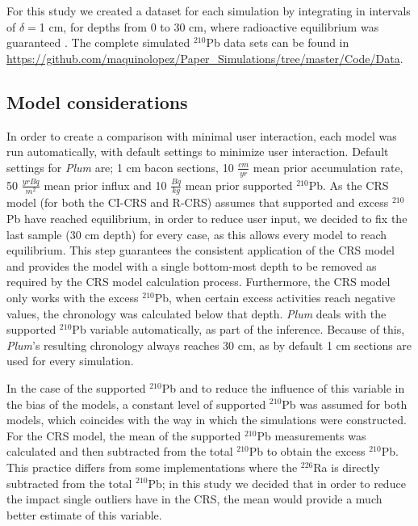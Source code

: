 \documentclass [10pt] {article}
\begin{document}
For this study we created a dataset for each simulation by integrating in intervals of $\delta =$1 cm, for depths from  0 to 30 cm, where radioactive equilibrium was guaranteed \citep{Aquino2018}.
The complete simulated $^{210}$Pb data sets can be found in \url{https://github.com/maquinolopez/Paper_Simulations/tree/master/Code/Data}.

\subsection{Model considerations}
In order to create a comparison with minimal user interaction, each model was run automatically, with default settings to minimize user interaction.
Default settings for \textit{Plum} are; 1 cm bacon sections, 10 $\frac{cm}{yr}$ mean prior accumulation rate, 50 $\frac{yr Bq}{m^2}$ mean prior influx and 10 $\frac{Bq}{kg}$ mean prior supported $^{210}$Pb.
As the CRS model (for both the CI-CRS and R-CRS) assumes that supported and excess $^{210}$Pb have reached equilibrium, in order to reduce user input, we decided to fix the last sample (30 cm depth) for every case, as this allows every model to reach equilibrium.
This step guarantees the consistent application of the CRS model and provides the model with a single bottom-most depth to be removed as required by the CRS model calculation process. 
Furthermore, the CRS model only works with the excess $^{210}$Pb, when certain excess activities reach negative values, the chronology was calculated below that depth.
\textit{Plum} deals with the supported $^{210}$Pb variable automatically, as part of the inference.
Because of this, \textit{Plum}'s resulting chronology always reaches 30 cm, as by default 1 cm sections are used for every simulation.

In the case of the supported $^{210}$Pb and to reduce the influence of this variable in the bias of the models, a constant level of supported $^{210}$Pb was assumed for both models, which coincides with the way in which the simulations were constructed.
For the CRS model, the mean of the supported $^{210}$Pb measurements was calculated and then subtracted from the total $^{210}$Pb to obtain the excess $^{210}$Pb.
This practice differs from some implementations where the $^{226}$Ra is directly subtracted from the total $^{210}$Pb; in this study we decided that in order to reduce the impact single outliers have in the CRS, the mean would provide a much better estimate of this variable.
\end{document}
